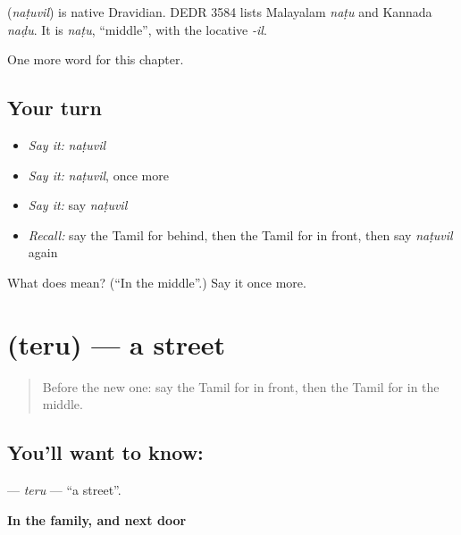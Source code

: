 \begin{cousinweb}
\textbf{} (\emph{naṭuvil}) is native Dravidian. DEDR 3584 lists Malayalam \emph{naṭu} and Kannada \emph{naḍu}. It is \emph{naṭu}, \textquotedblleft{}middle\textquotedblright{}, with the locative \emph{-il}.
\end{cousinweb}

\begin{grammarlens}[title={What you've built}]
One more word for this chapter.
\end{grammarlens}

\subsection*{Your turn}
\begin{itemize}
\raggedright
  \item \emph{Say it:} \emph{naṭuvil}
  \item \emph{Say it:} \emph{naṭuvil}, once more
  \item \emph{Say it:} say \emph{naṭuvil}
  \item \emph{Recall:} say the Tamil for behind, then the Tamil for in front, then say \emph{naṭuvil} again
\end{itemize}

\begin{tcolorbox}[breakable,colback=teal!4,colframe=teal!35!black,title={Before you move on}]
What does  mean? (\textquotedblleft{}In the middle\textquotedblright{}.) Say it once more.
\end{tcolorbox}
\section[\texorpdfstring{\ta{தெரு} (teru)}{தெரு (teru)}]{ (teru) — a street}

\label{lesson:TA-C114-teru}



\begin{quote}
Before the new one: say the Tamil for in front, then the Tamil for in the middle.
\end{quote}

\subsection*{You'll want to know: }
\textbf{} — \emph{teru} — \textquotedblleft{}a street\textquotedblright{}.

\textbf{In the family, and next door}

